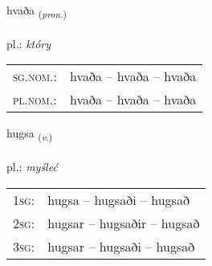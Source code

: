 \documentclass[frontgrid, backgrid]{flacards}\usepackage[]{graphicx}\usepackage[]{xcolor}
\begin{document}
{hvaða \small{\textsubscript{(\textit{pron.})}} \\[1ex] %
\textphonetic{[kʰvaːða]} \\
pl.: \emph{który} \\  [2ex]
\renewcommand*{\arraystretch}{0.8}
\begin{tabular}{ll}
\textsc{sg.nom.}: & hvaða  --  hvaða -- hvaða \\ 
\textsc{pl.nom.}: & hvaða -- hvaða -- hvaða
\end{tabular}
}

\renewcommand{\flhead}{\vskip5pt \fboxsep=0pt {\small\bfseries\footnotesize Sagnorð | Verb}}
\renewcommand{\fcfoot}{\vskip5pt \fboxsep=0pt \hspace{2pt}{\small\bfseries\footnotesize 1K}}

\renewcommand{\blhead}{\vskip5pt {\small\bfseries\footnotesize Sagnorð | Verb }}
\renewcommand{\bcfoot}{\vskip5pt \hspace{2pt}{\small\bfseries\footnotesize 1K}}


{hugsa \small{\textsubscript{(\textit{v.})}} \\[1ex] %
\textphonetic{[hʏksa]} \\
pl.: \emph{myśleć} \\  [2ex]
\renewcommand*{\arraystretch}{0.8}
\begin{tabular}{p{1cm}l}
\textsc{1sg}: & hugsa -- hugsaði -- hugsað \\ 
\textsc{2sg}: & hugsar -- hugsaðir -- hugsað \\ 
\textsc{3sg}: & hugsar -- hugsaði -- hugsað \\ 
\end{tabular}
}

\renewcommand{\flhead}{\vskip5pt \fboxsep=0pt {\small\bfseries\footnotesize Sagnorð | Verb}}
\renewcommand{\fcfoot}{\vskip5pt \fboxsep=0pt \hspace{2pt}{\small\bfseries\footnotesize 1K}}

\renewcommand{\blhead}{\vskip5pt {\small\bfseries\footnotesize Sagnorð | Verb }}
\renewcommand{\bcfoot}{\vskip5pt \hspace{2pt}{\small\bfseries\footnotesize 1K}}
\end{document}
